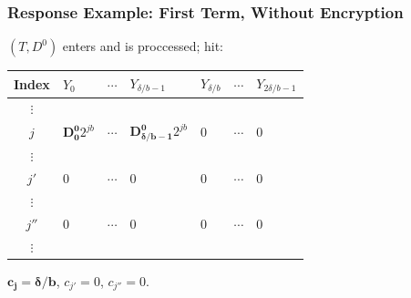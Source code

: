 \documentclass{beamer}
\makeatletter
\DeclareRobustCommand*{\&}{%
  \nfss@text{%
    \fontfamily{LinuxBiolinumT-TLF}%
    \selectfont
    \symbol{`\&}%
  }%
}
\makeatother
\begin{document}
\begin{frame}
  \frametitle{Response Example: First Term, Without Encryption}
  $(T, D^0)$ enters and is proccessed; hit:
  \begin{center}
  \begin{tabular}{c  C{1.55cm}  c  C{1.55cm}  C{1.55cm}  c  C{1.55cm}  }
     {\scriptsize Index}             & $Y_0$\qquad            & $\cdots$\qquad         & $Y_{\delta/b-1}$\qquad & $Y_{\delta/b}$\qquad   & $\cdots$\qquad         & $Y_{2\delta/b-1}$\qquad\\\toprule
     $\vdots$ & \\
     {\footnotesize$j$} & {\footnotesize $\bm{D^0_0} 2^{jb}$}                         & $\cdots$                         & {\footnotesize $\bm{D^0_{\delta/b-1}} 2^{jb}$}                      & 0                         & $\cdots$                         & 0                         \\
     $\vdots$ & \\
     {\footnotesize$j'$}  & 0 & $\cdots$                           & 0                           & 0                      & $\cdots$                           & 0\\
     $\vdots$ & \\
     {\footnotesize$j''$}  & 0 & $\cdots$                           & 0         & 0                      & $\cdots$                           & 0\\
    $\vdots$ & \\\bottomrule
  \end{tabular}
  \end{center}
  $\bm{c_{j} = \delta/b}$, $c_{j'} = 0$, $c_{j''} = 0$.
\end{frame}
\end{document}
